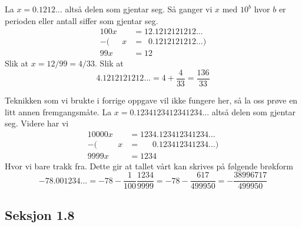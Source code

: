 \documentclass[a4paper,11pt]{article}
\begin{document}
\begin{solution}
  La $x = \num{0.1212}\ldots$ altså delen som gjentar seg. Så ganger vi $x$
  med $10^b$ hvor $b$ er perioden eller antall siffer som gjentar seg. 
  \begin{align*}
    100x &= \num{12.1212121212}\ldots \\
    -(\phantom{100}x &= \phantom{1}\num{0.1212121212}\ldots) \\
    99x & = 12
  \end{align*}
  Slik at $x = 12/99 = 4/33$. Slik at
  \begin{equation}
    \num{4.1212121212}\ldots = 4 + \frac{4}{33} = \frac{136}{33}
  \end{equation}
\end{solution}

\newpageLF

\begin{solution}
   Teknikken som vi brukte i
  forrige oppgave vil ikke fungere her, så la oss prøve en litt annen
  fremgangsmåte. La $x = \num{0.1234123412341234}\ldots$ altså delen som
  gjentar seg. Videre har vi 
  \begin{align*}
    10000x &= \num{1234.123412341234}\ldots \\
    -(\phantom{10000}x &=\phantom{123}\num{0.123412341234}\ldots) \\
    9999x & = 1234
  \end{align*}
  Hvor vi bare trakk fra. Dette gir at tallet vårt kan skrives på følgende
  brøkform
  \begin{equation*}
    \num{-78.001234}\ldots
    = -78 - \frac{1}{100}\frac{1234}{9999} 
    = -78 - \frac{617}{\num{499950}}
    = -\frac{\num{38996717}}{\num{499950}}
  \end{equation*}
\end{solution}



\subsection*{Seksjon 1.8}

\end{document}
